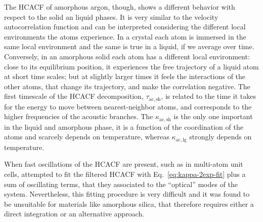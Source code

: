 \begin{LEtext}
The HCACF of amorphous argon, though, shows a different behavior with respect to the solid an liquid phases. It is very similar to the velocity autocorrelation function and can be interpreted considering the different local environments the atoms experience. In a crystal each atom is immersed in the same local environment and the same is true in a liquid, if we average over time. Conversely, in an amorphous solid each atom has a different local environment: close to its equilibrium position, it experiences the free trajectory of a liquid atom at short time scales; but at slightly larger times it feels the interactions of the other atoms, that change its trajectory, and make the correlation negative. 
The first timescale of the HCACF decomposition, $\tau_{\mathrm{ac,sh}}$, is related to the time it takes for the energy to move between nearest-neighbor atoms, and corresponds to the higher frequencies of the acoustic branches. The $\kappa_{\mathrm{ac,sh}}$ is the only one important in the liquid and amorphous phase, it is a function of the coordination of the atoms and scarcely depends on temperature, whereas $\kappa_{\mathrm{ac,lg}}$ strongly depends on temperature.

When fast oscillations of the HCACF are present, such as in multi-atom unit cells, \citet{McGaughey2004b} attempted to fit the filtered HCACF with Eq.~\eqref{eq:kappa-2exp-fit} plus a sum of oscillating terms, that they associated to the ``optical'' modes of the system. 
Nevertheless, this fitting procedure is very difficult and it was found to be unsuitable for materials like amorphous silica, that therefore requires either a direct integration or an alternative approach.



\end{LEtext}

